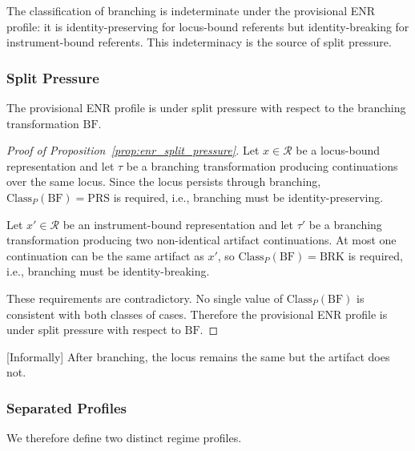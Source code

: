 The classification of branching is indeterminate under the provisional ENR profile:
it is identity-preserving for locus-bound referents but identity-breaking
for instrument-bound referents.
This indeterminacy is the source of split pressure.


\subsubsection{Split Pressure}

\begin{proposition}
\label{prop:enr_split_pressure}
The provisional ENR profile is under split pressure with respect to
the branching transformation $\mathrm{BF}$.
\end{proposition}

\begin{proof}[Proof of Proposition~\ref{prop:enr_split_pressure}]
Let $x \in \mathcal{R}$ be a locus-bound representation and let $\tau$ be a
branching transformation producing continuations over the same locus.
Since the locus persists through branching,
$\mathrm{Class}_P(\mathrm{BF}) = \mathrm{PRS}$ is required,
i.e., branching must be identity-preserving.

Let $x' \in \mathcal{R}$ be an instrument-bound representation and let $\tau'$ be a
branching transformation producing two non-identical artifact continuations.
At most one continuation can be the same artifact as $x'$,
so $\mathrm{Class}_P(\mathrm{BF}) = \mathrm{BRK}$ is required,
i.e., branching must be identity-breaking.

These requirements are contradictory.
No single value of $\mathrm{Class}_P(\mathrm{BF})$ is consistent with both classes of cases.
Therefore the provisional ENR profile is under split pressure with respect to $\mathrm{BF}$.
\end{proof}

[Informally]
After branching, the locus remains the same but the artifact does not.


\subsubsection{Separated Profiles}

We therefore define two distinct regime profiles.


